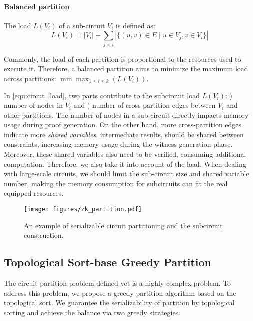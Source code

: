\paragraph{Balanced partition} The load $L(V_i)$ of a sub-circuit $V_i$ is defined as: 
\begin{equation}\label{equ:circut_load}
L(V_i) = |V_i| + \sum_{j < i} \left| \{  (u, v) \in E \mid u \in V_j, v \in V_i\} \right|     
\end{equation}

Commonly, the load of each partition is proportional to the resources used to execute it. 
Therefore, a balanced partition aims to minimize the maximum load across partitions: 
$\min \max_{1\leq i \leq k}(L(V_i))$. 

In \cref{equ:circut_load}, two parts contribute to the subcircuit load $L(V_i)$: ) number of nodes in $V_i$ and ) number of cross-partition edges between $V_i$ and other partitions. The number of nodes in a sub-circuit directly impacts memory usage during proof generation. On the other hand, more cross-partition edges indicate more \emph{shared variables}, intermediate results, should be shared between constraints, increasing memory usage during the witness generation phase. Moreover, these shared variables also need to be verified, consuming additional computation. 
Therefore, we also take it into account of the load. When dealing with large-scale circuits, we should limit the sub-circuit size and shared variable number, making the memory consumption for subcircuits can fit the real equipped resources. 


\begin{figure}[t]
    \centering
    \texttt{[image: figures/zk\_partition.pdf]}
    \caption{An example of serializable circuit partitioning and the subcircuit construction. }
    \label{fig:circuit_partition}
\end{figure}

\subsection{Topological Sort-base Greedy Partition}

The circuit partition problem defined yet is a highly complex problem. To address this problem, we propose a greedy partition algorithm based on the topological sort.  We guarantee the serializability of partition by topological sorting and achieve the balance via two greedy strategies. 

